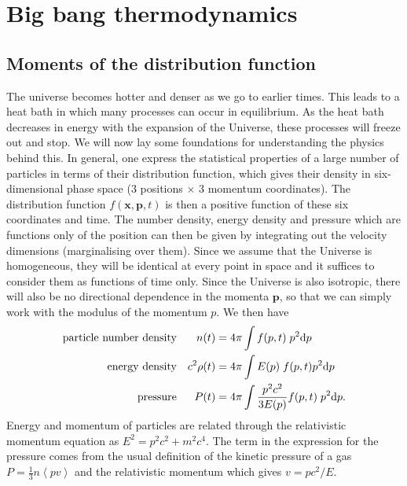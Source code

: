 \documentclass[a4paper]{article}
\begin{document}
\section{Big bang thermodynamics}
\subsection{Moments of the distribution function}
The universe becomes hotter and denser as we go to earlier times. This leads to a heat bath in which many processes can occur in equilibrium. As the heat bath decreases in energy with the expansion of the Universe, these processes will freeze out and stop. We will now lay some foundations for understanding the physics behind this. In general, one express the statistical properties of a large number of particles in terms of their distribution function, which gives their density in six-dimensional phase space (3 positions $\times$ 3 momentum coordinates). The distribution function $f(\mathbf{x},\mathbf{p},t)$ is then a positive function of these six coordinates and time. The number density, energy density and pressure which are functions only of the position can then be given by integrating out the velocity dimensions (marginalising over them). Since we assume that the Universe is homogeneous, they will be identical at every point in space and it suffices to consider them as functions of time only. Since the Universe is also isotropic, there will also be no directional dependence in the momenta $\mathbf{p}$, so that we can simply work with the modulus of the momentum $p$. We then have
\begin{align}
\text{particle number density} && n(t) & =  4\pi \int f(p,t) \;p^2 {\rm d}p \\
\text{energy density} && c^2\rho(t) & = 4\pi\int E(p) \;f(p,t) p^2 {\rm d}p \\
\text{pressure} && P(t) & =  4\pi \int \frac{p^2 c^2}{3E(p)} f(p,t) \;p^2 {\rm d}p.
\end{align}
Energy and momentum of particles are related through the relativistic momentum equation as $E^2 = p^2c^2+m^2c^4$. The term in the expression for the pressure comes from the usual definition of the kinetic pressure of a gas $P=\frac{1}{3}n\left<p v\right>$ and the relativistic momentum which gives $v = p c^2/E$.
\end{document}
